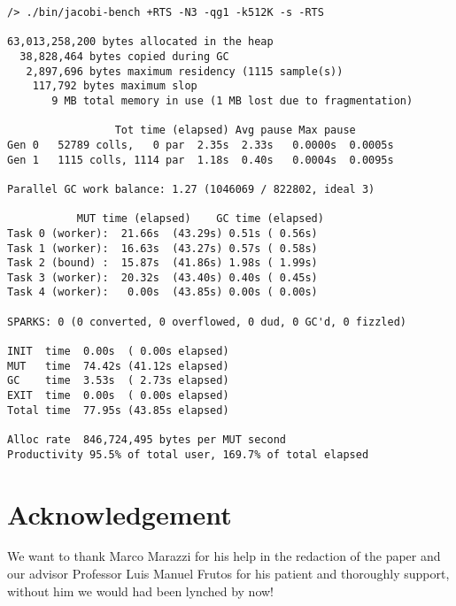 \documentclass{tmr}
\begin{document}
\begin{lstlisting}[float,captionpos=b,belowcaptionskip=4pt, caption=Haskell test run 5]
/> ./bin/jacobi-bench +RTS -N3 -qg1 -k512K -s -RTS

63,013,258,200 bytes allocated in the heap
  38,828,464 bytes copied during GC
   2,897,696 bytes maximum residency (1115 sample(s))
    117,792 bytes maximum slop
       9 MB total memory in use (1 MB lost due to fragmentation)

                 Tot time (elapsed) Avg pause Max pause
Gen 0   52789 colls,   0 par  2.35s  2.33s   0.0000s  0.0005s
Gen 1   1115 colls, 1114 par  1.18s  0.40s   0.0004s  0.0095s

Parallel GC work balance: 1.27 (1046069 / 822802, ideal 3)

           MUT time (elapsed)    GC time (elapsed)
Task 0 (worker):  21.66s  (43.29s) 0.51s ( 0.56s)
Task 1 (worker):  16.63s  (43.27s) 0.57s ( 0.58s)
Task 2 (bound) :  15.87s  (41.86s) 1.98s ( 1.99s)
Task 3 (worker):  20.32s  (43.40s) 0.40s ( 0.45s)
Task 4 (worker):   0.00s  (43.85s) 0.00s ( 0.00s)

SPARKS: 0 (0 converted, 0 overflowed, 0 dud, 0 GC'd, 0 fizzled)

INIT  time  0.00s  ( 0.00s elapsed)
MUT   time  74.42s (41.12s elapsed)
GC    time  3.53s  ( 2.73s elapsed)
EXIT  time  0.00s  ( 0.00s elapsed)
Total time  77.95s (43.85s elapsed)

Alloc rate  846,724,495 bytes per MUT second
Productivity 95.5% of total user, 169.7% of total elapsed
\end{lstlisting}

\section{Acknowledgement}

We want to thank Marco Marazzi for his help
in the redaction of the paper and our advisor
Professor Luis Manuel Frutos for his patient
and thoroughly support, without
him we would had been lynched by now!
\end{document}
